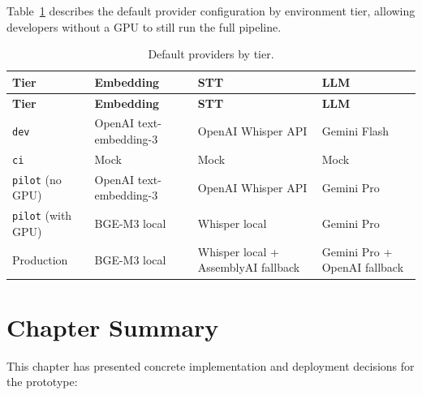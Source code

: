 Table~\ref{tab:provider-matrix} describes the default provider
configuration by environment tier, allowing developers without a GPU to
still run the full pipeline.

\begin{longtable}{|p{2.5cm}|p{3.5cm}|p{3.5cm}|p{3.5cm}|}
\caption{Default providers by tier.}
\label{tab:provider-matrix} \\
\hline
\textbf{Tier} & \textbf{Embedding} & \textbf{STT} & \textbf{LLM} \\
\hline
\endfirsthead
\hline
\textbf{Tier} & \textbf{Embedding} & \textbf{STT} & \textbf{LLM} \\
\hline
\endhead

\texttt{dev} & OpenAI text-embedding-3 & OpenAI Whisper API &
    Gemini Flash \\
\hline
\texttt{ci} & Mock & Mock & Mock \\
\hline
\texttt{pilot} (no GPU) & OpenAI text-embedding-3 & OpenAI Whisper API
    & Gemini Pro \\
\hline
\texttt{pilot} (with GPU) & BGE-M3 local & Whisper local &
    Gemini Pro \\
\hline
Production & BGE-M3 local & Whisper local + AssemblyAI fallback
    & Gemini Pro + OpenAI fallback \\
\hline
\end{longtable}

\section{Chapter Summary}

This chapter has presented concrete implementation and deployment
decisions for the prototype:


